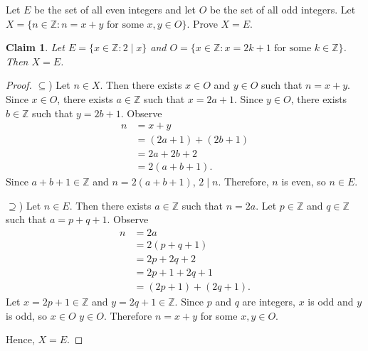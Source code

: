 \documentclass{article}
\newcommand{\Z}{\mathbb{Z}}
\newtheorem*{claim}{Claim}
\theoremstyle{definition}
\begin{document}
\begin{question}
   Let $E$ be the set of all even integers and let $O$ be the set of all odd integers. Let $X=\{ n\in \Z : n = x+y \text{ for some } x, y\in O\}$. Prove $X=E$.
\end{question}
\begin{solution}
\begin{claim}
Let $E=\{x\in\Z:2\mid x\}$ and $O=\{x\in\Z:x=2k+1\text{ for some }k\in\Z\}$. Then $X=E$.
\end{claim}
\begin{proof}
$\subseteq$) Let $n\in X$. Then there exists $x\in O$ and $y\in O$ such that $n=x+y$. Since $x\in O$, there exists $a\in\Z$ such that $x=2a+1$. Since $y\in O$, there exists $b\in\Z$ such that $y=2b+1$. Observe
\begin{align*}
n
&=x+y\\
&=(2a+1)+(2b+1)\\
&=2a+2b+2\\
&=2(a+b+1).
\end{align*}
Since $a+b+1\in\Z$ and $n=2(a+b+1)$, $2\mid n$. Therefore, $n$ is even, so $n\in E$.
\newline

$\supseteq$) Let $n\in E$. Then there exists $a\in\Z$ such that $n=2a$. Let $p\in\Z$ and $q\in\Z$ such that $a=p+q+1$. Observe
\begin{align*}
n
&=2a\\
&=2(p+q+1)\\
&=2p+2q+2\\
&=2p+1+2q+1\\
&=(2p+1)+(2q+1).
\end{align*}
Let $x=2p+1\in\Z$ and $y=2q+1\in\Z$. Since $p$ and $q$ are integers, $x$ is odd and $y$ is odd, so $x\in O$ $y\in O$. Therefore $n=x+y$  for some $x,y\in O$.
\newline

Hence, $X=E$.
\end{proof}
\end{solution}
\end{document}
